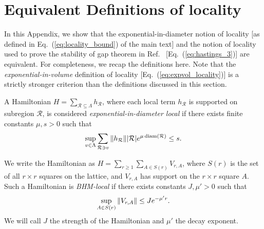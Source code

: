 \section{Equivalent Definitions of locality}
\label{app:locality_equivalence}
In this Appendix, we show that the exponential-in-diameter notion of locality [as defined in Eq.~(\ref{eq:locality_bound}) of the main text] and the notion of locality used to prove the stability of gap theorem in Ref.~ [Eq.~(\ref{eq:hastings_3})] are equivalent. For completeness, we recap the definitions here. Note that the \emph{exponential-in-volume} definition of locality [Eq.~(\ref{eq:expvol_locality})] is a strictly stronger criterion than the definitions discussed in this section.

\begin{defn}
    A Hamiltonian $H = \sum_{\mathcal{R} \subseteq \Lambda} h_{\mathcal{R}}$, where each local term $h_{\mathcal{R}}$ is supported on subregion $\mathcal{R}$, is considered \emph{exponential-in-diameter local} if there exists finite constants $\mu,s> 0$ such that 
    \begin{equation}
        \sup_{v \in \Lambda} \sum_{\mathcal{R} \ni v} \norm{h_{\mathcal{R}}} \abs{\mathcal{R}} e^{\mu \operatorname{diam}(\mathcal{R})} \leq s.
    \end{equation}
\end{defn}

\begin{defn}
    We write the Hamiltonian as $H = \sum_{r \geq 1} \sum_{A \in S(r)} V_{r,A}$, where $S(r)$ is the set of all $r\times r$ squares on the lattice, and $V_{r,A}$ has support on the $r\times r$ square $A$. Such a Hamiltonian is \emph{BHM-local} if there exists constants $J,\mu' > 0 $ such that
\begin{equation}
    \sup_{A\in S(r)} \norm{V_{r,A}} \leq J e^{-\mu' r} .
\end{equation}
We will call $J$ the strength of the Hamiltonian and $\mu'$ the decay exponent. 
\end{defn}


